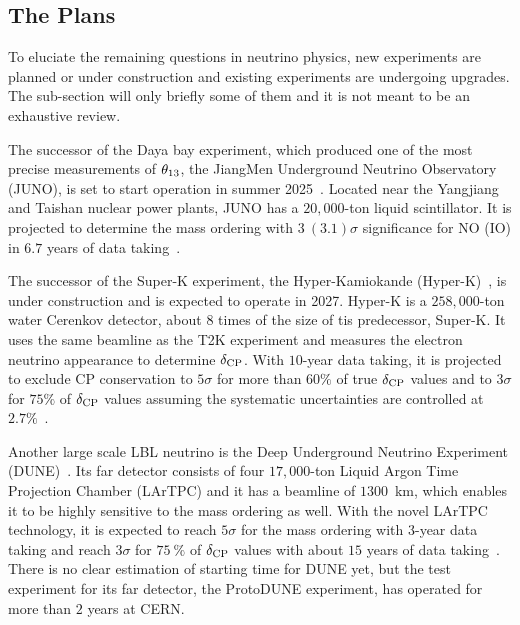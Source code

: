 \subsection{The Plans}
To eluciate the remaining questions in neutrino physics, new experiments are planned or under construction and existing experiments are undergoing upgrades.
The sub-section will only briefly some of them and it is not meant to be an exhaustive review.

The successor of the Daya bay experiment, which produced one of the most precise measurements of $\theta_{13}$, the JiangMen Underground Neutrino Observatory (JUNO), is set to start operation in summer 2025~\cite{ScienceNews2025}.
Located near the Yangjiang and Taishan nuclear power plants, JUNO has a $20,000$-ton liquid scintillator.
It is projected to determine the mass ordering with $3~(3.1)\sigma$ significance for NO (IO) in $6.7$ years of data taking~\cite{Paoloni:2024atc}.

The successor of the Super-K experiment, the Hyper-Kamiokande (Hyper-K)~\cite{Hyper-Kamiokande:2018ofw}, is under construction and is expected to operate in 2027.
Hyper-K is a $258,000$-ton water Cerenkov detector, about $8$ times of the size of tis predecessor, Super-K.
It uses the same beamline as the T2K experiment and measures the electron neutrino appearance to determine $\delta_\textrm{CP}$.
With $10$-year data taking, it is projected to exclude CP conservation to $5\sigma$ for more than $60\%$ of true $\delta_\textrm{CP}$ values and to $3\sigma$ for $75\%$ of $\delta_\textrm{CP}$ values assuming the systematic uncertainties are controlled at $2.7\%$~\cite{Jesus-Valls:2024ady}.

Another large scale LBL neutrino is the Deep Underground Neutrino Experiment (DUNE)~\cite{DUNE:2016hlj,DUNE:2015lol,DUNE:2016evb,DUNE:2016rla,DUNE:2021tad}.
Its far detector consists of four $17,000$-ton Liquid Argon Time Projection Chamber (LArTPC) and it has a beamline of $1300$~km, which enables it to be highly sensitive to the mass ordering as well.
With the novel LArTPC technology, it is expected to reach $5\sigma$ for the mass ordering with 3-year data taking and reach $3\sigma$ for $75~\%$ of $\delta_\textrm{CP}$ values with about $15$ years of data taking~\cite{Gil-Botella:2024duf}.
There is no clear estimation of starting time for DUNE yet, but the test experiment for its far detector, the ProtoDUNE experiment, has operated for more than $2$ years at CERN.

